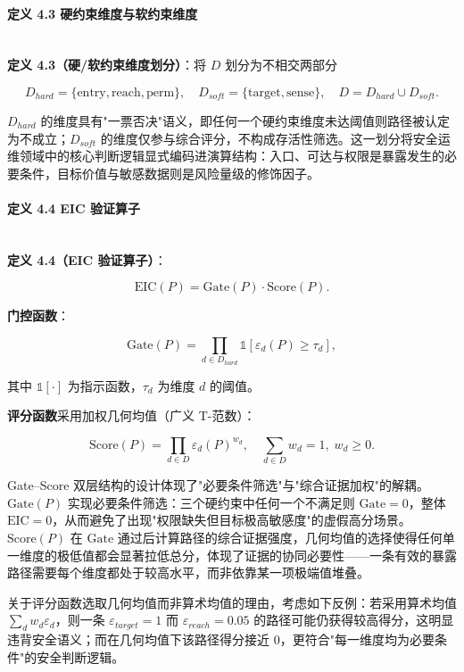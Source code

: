 \documentclass[a4paper,12pt]{ctexart}
\begin{document}
\paragraph{定义 4.3 硬约束维度与软约束维度}\mbox{}\\

\textbf{定义 4.3（硬/软约束维度划分）}：将 $D$ 划分为不相交两部分

\[
D_{hard} = \{\text{entry}, \text{reach}, \text{perm}\}, \quad D_{soft} = \{\text{target}, \text{sense}\}, \quad D = D_{hard} \cup D_{soft}.
\]

$D_{hard}$ 的维度具有"一票否决"语义，即任何一个硬约束维度未达阈值则路径被认定为不成立；$D_{soft}$ 的维度仅参与综合评分，不构成存活性筛选。这一划分将安全运维领域中的核心判断逻辑显式编码进演算结构：入口、可达与权限是暴露发生的必要条件，目标价值与敏感数据则是风险量级的修饰因子。

\paragraph{定义 4.4 EIC 验证算子}\mbox{}\\

\textbf{定义 4.4（EIC 验证算子）}：

\[
\text{EIC}(P) = \text{Gate}(P) \cdot \text{Score}(P).
\]

\textbf{门控函数}：

\[
\text{Gate}(P) = \prod_{d \in D_{hard}} \mathbb{1}\!\left[\varepsilon_d(P) \geq \tau_d\right],
\]

其中 $\mathbb{1}[\cdot]$ 为指示函数，$\tau_d$ 为维度 $d$ 的阈值。

\textbf{评分函数}采用加权几何均值（广义 T-范数）：

\[
\text{Score}(P) = \prod_{d \in D} \varepsilon_d(P)^{w_d}, \quad \sum_{d \in D} w_d = 1, \; w_d \geq 0.
\]

Gate–Score 双层结构的设计体现了"必要条件筛选"与"综合证据加权"的解耦。$\text{Gate}(P)$ 实现必要条件筛选：三个硬约束中任何一个不满足则 $\text{Gate}=0$，整体 $\text{EIC}=0$，从而避免了出现"权限缺失但目标极高敏感度"的虚假高分场景。$\text{Score}(P)$ 在 $\text{Gate}$ 通过后计算路径的综合证据强度，几何均值的选择使得任何单一维度的极低值都会显著拉低总分，体现了证据的协同必要性——一条有效的暴露路径需要每个维度都处于较高水平，而非依靠某一项极端值堆叠。

关于评分函数选取几何均值而非算术均值的理由，考虑如下反例：若采用算术均值 $\sum_d w_d \varepsilon_d$，则一条 $\varepsilon_{target}=1$ 而 $\varepsilon_{reach}=0.05$ 的路径可能仍获得较高得分，这明显违背安全语义；而在几何均值下该路径得分接近 0，更符合"每一维度均为必要条件"的安全判断逻辑。
\end{document}
